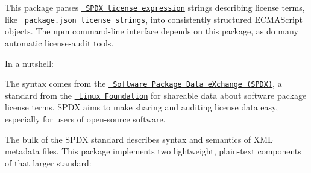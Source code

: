This package parses \href{https://spdx.org/spdx-specification-21-web-version\#h.jxpfx0ykyb60}{\texttt{ SPDX license expression}} strings describing license terms, like \href{https://docs.npmjs.com/files/package.json\#license}{\texttt{ package.\+json license strings}}, into consistently structured ECMAScript objects. The npm command-\/line interface depends on this package, as do many automatic license-\/audit tools.

In a nutshell\+:


\begin{DoxyCode}{0}
\DoxyCodeLine{}
\DoxyCodeLine{)}
\DoxyCodeLine{}
\DoxyCodeLine{\})}
\DoxyCodeLine{}
\DoxyCodeLine{  \{}
\DoxyCodeLine{    \}}
\DoxyCodeLine{  \}}
\DoxyCodeLine{)}

\end{DoxyCode}


The syntax comes from the \href{https://spdx.org/}{\texttt{ Software Package Data e\+Xchange (SPDX)}}, a standard from the \href{https://www.linuxfoundation.org}{\texttt{ Linux Foundation}} for shareable data about software package license terms. SPDX aims to make sharing and auditing license data easy, especially for users of open-\/source software.

The bulk of the SPDX standard describes syntax and semantics of XML metadata files. This package implements two lightweight, plain-\/text components of that larger standard\+:


